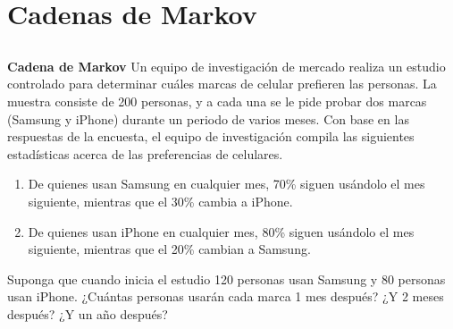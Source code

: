\section{Cadenas de Markov}

\subsection{}

\begin{frame}%
	
	\begin{ejer}{\textbf{Cadena de Markov}}\justifying 
		Un equipo de investigación de mercado realiza un estudio controlado para determinar
		cuáles marcas de celular prefieren las personas. La muestra consiste de 200 personas, y a cada una
		se le pide probar dos marcas (Samsung y iPhone) durante un periodo de varios meses. Con base
		en las respuestas de la encuesta, el equipo de investigación compila las siguientes estadísticas 
		acerca de las preferencias de celulares.
		\begin{enumerate}
			\item[\labelname{$a$}] De quienes usan Samsung en cualquier mes, 70\% siguen usándolo el mes siguiente,
			mientras que el 30\% cambia a iPhone.
			\item[\labelname{$a$}] De quienes usan iPhone en cualquier mes, 80\% siguen usándolo el mes siguiente, 
			mientras que el 20\% cambian a Samsung.
		\end{enumerate}
		Suponga que cuando inicia el estudio 120 personas usan Samsung y 80 personas usan iPhone. 
		¿Cuántas personas usarán cada marca 1 mes después? ¿Y 2 meses después? ¿Y un año después?
	\end{ejer}
	
	\vspace{-5mm}
	

\end{frame}
